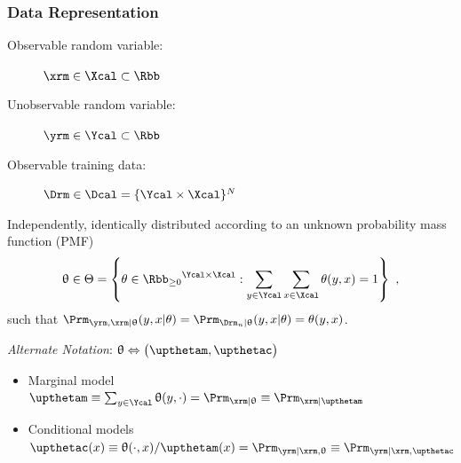 \documentclass[aspectratio=169]{beamer}
\begin{document}
\begin{frame}
\frametitle{Data Representation}

\begin{description}
\item[Observable random variable:] $\xrm \in \Xcal \subset \Rbb$
\item[Unobservable random variable:] $\yrm \in \Ycal \subset \Rbb$
\item[Observable training data:] $\Drm \in \Dcal = \{\Ycal \times \Xcal\}^N$
\end{description}

\vspace{0.5em}

Independently, identically distributed according to an \alert{unknown} probability mass function (PMF) 
\begin{equation*}
\uptheta \in \Theta = \left\{ \theta \in {\Rbb_{\geq 0}}^{\Ycal \times \Xcal}: \sum_{y \in \Ycal} \sum_{x \in \Xcal} \theta(y,x) = 1 \right\} \ ,
\end{equation*}
such that $\Prm_{\yrm,\xrm | \uptheta}(y,x | \theta) = \Prm_{\Drm_n | \uptheta}(y,x | \theta) = \theta(y,x)$.

\hrulefill

\vspace{0.5em}
\textit{Alternate Notation}: $\uptheta \Leftrightarrow \big( \upthetam,\upthetac \big)$
\begin{itemize}
\item Marginal model $\upthetam \equiv \sum_{y \in \Ycal} \uptheta(y,\cdot) = \Prm_{\xrm | \uptheta} \equiv \Prm_{\xrm | \upthetam}$
\item Conditional models $\upthetac(x) \equiv \uptheta(\cdot,x) / \upthetam(x) = \Prm_{\yrm | \xrm,\uptheta} \equiv \Prm_{\yrm | \xrm,\upthetac}$ 
\end{itemize}

\end{frame}
\end{document}
